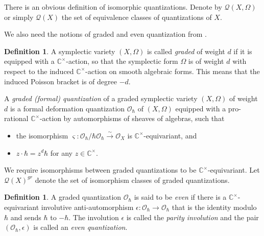 \documentclass[11pt, a4paper]{amsart}
\newcommand{\C}{\mathbb{C}}
\newcommand{\hb}{\hbar}
\newcommand{\quan}{\mathcal{Q}}
\newcommand{\cm}{\C^\times}
\newcommand{\OO}{\mathcal{O}}
\theoremstyle{definition}
\newtheorem{defi}[Thm]{Definition}
\numberwithin{equation}{section}
\begin{document}
There is an obvious definition of isomorphic quantizations. Denote by $\quan(X, \Omega)$ or simply $\quan(X)$ the set of equivalence classes of quantizations of $X$. 

We also need the notions of graded and even quantization from \cite[Section 2.2]{Losev:isom_quant}.

\begin{defi}\label{defn:graded_quan}
	A symplectic variety $(X, \Omega)$ is called \emph{graded} of weight $d$ if it is equipped with a $\cm$-action, so that the symplectic form $\Omega$ is of weight $d$ with respect to the induced $\cm$-action on smooth algebraic forms. This means that the induced Poisson bracket is of degree $-d$. 
	
	A \emph{graded (formal) quantization} of a graded symplectic variety $(X, \Omega)$ of weight $d$ is a formal deformation quantization $\OO_\hb$ of $(X, \Omega)$ equipped with a pro-rational $\cm$-action by automorphisms of sheaves of algebras, such that 
	\begin{itemize}
		\item[(i)] the isomorphism $\varsigma: \OO_\hb / \hb \OO_\hb \xrightarrow{\sim} \OO_X$ is $\cm$-equivariant, and
		\item[(ii)] $z \cdot \hb = z^d \hb$ for any $z \in \cm$.
	\end{itemize}
	We require isomorphisms between graded quantizations to be $\cm$-equivariant. Let $\quan(X)^{gr}$ denote the set of isomorphism classes of graded quantizations.
\end{defi}

\begin{defi}\label{defn:even_quant}
	A graded quantization $\OO_\hb$ is said to be \emph{even} if there is a $\cm$-equivariant involutive anti-automorphism $\epsilon: \OO_\hb \to \OO_\hb$ that is the identity modulo $\hb$ and sends $\hb$ to $-\hb$. The involution $\epsilon$ is called the {\it parity involution} and the pair $(\OO_\hb,\epsilon)$ is called an \emph{even quantization}. 
\end{defi}
\end{document}
